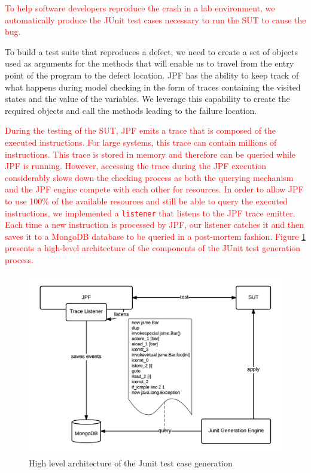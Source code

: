 \documentclass[times, doublespace]{smrauth}
\newcommand{\red}[1]{\textcolor{red}{#1}}
\begin{document}
{\red{To help software developers reproduce the crash in a lab
environment, we automatically produce the JUnit test cases
necessary to run the SUT to cause the bug.}

To build a test suite that reproduces a defect, we need to create
a set of objects used as arguments for the methods that will
enable us to travel from the entry point of the program to the
defect location. JPF has the ability to keep track of what
happens during model checking in the form of traces
containing the visited states and the value of the variables. We
leverage this capability to create the required objects and call
the methods leading to the failure location.

\red{During the testing of the SUT, JPF emits a trace that is composed of the executed instructions.
For large systems, this trace can contain millions of instructions. This trace is stored in memory and therefore can be queried while JPF is running.
However, accessing the trace during the JPF execution considerably slows down the checking process as both the querying mechanism and the JPF engine compete with each other for resources.
In order to allow JPF to use 100\% of the available resources and still be able to query the executed instructions, we implemented a {\tt listener} that listens to the JPF trace emitter.
Each time a new instruction is processed by JPF, our listener catches it and then saves it to a MongoDB database to be queried in a post-mortem fashion. Figure \ref{fig:jcharming-unittest} presents a high-level architecture of the components of the JUnit test generation process.}

\begin{figure}
  \centering
    \includegraphics[scale=0.8]{media/unittest.png}
    \caption{High level architecture of the Junit test case generation
    \label{fig:jcharming-unittest}}
\end{figure}


}
\end{document}
